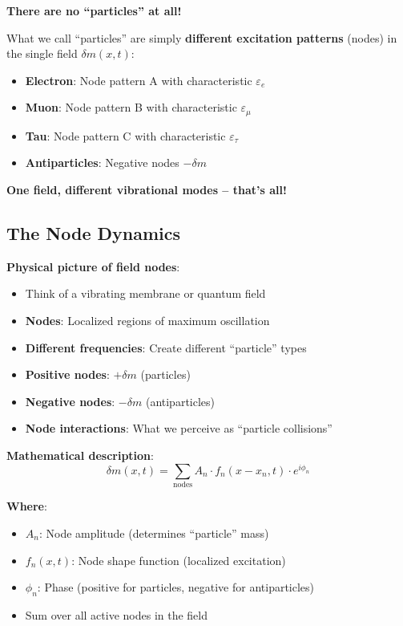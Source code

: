 \documentclass[12pt,a4paper]{article}
\newcommand{\deltam}{\delta m}
\theoremstyle{definition}
\theoremstyle{remark}
\begin{document}
	\begin{tcolorbox}[colback=purple!5!white,colframe=purple!75!black,title=Ultimate Truth: No Separate Particles]
		\textbf{There are no ``particles'' at all!}
		
		What we call ``particles'' are simply \textbf{different excitation patterns} (nodes) in the single field $\deltam(x,t)$:
		
		\begin{itemize}
			\item \textbf{Electron}: Node pattern A with characteristic $\varepsilon_e$
			\item \textbf{Muon}: Node pattern B with characteristic $\varepsilon_{\mu}$
			\item \textbf{Tau}: Node pattern C with characteristic $\varepsilon_{\tau}$
			\item \textbf{Antiparticles}: Negative nodes $-\deltam$
		\end{itemize}
		
		\textbf{One field, different vibrational modes -- that's all!}
	\end{tcolorbox}
	
	\subsection{The Node Dynamics}
	
	\textbf{Physical picture of field nodes}:
	\begin{itemize}
		\item Think of a vibrating membrane or quantum field
		\item \textbf{Nodes}: Localized regions of maximum oscillation
		\item \textbf{Different frequencies}: Create different ``particle'' types
		\item \textbf{Positive nodes}: $+\deltam$ (particles)
		\item \textbf{Negative nodes}: $-\deltam$ (antiparticles)
		\item \textbf{Node interactions}: What we perceive as ``particle collisions''
	\end{itemize}
	
	\textbf{Mathematical description}:
	\begin{equation}
		\deltam(x,t) = \sum_{\text{nodes}} A_n \cdot f_n(x-x_n, t) \cdot e^{i\phi_n}
	\end{equation}
	
	\textbf{Where}:
	\begin{itemize}
		\item $A_n$: Node amplitude (determines ``particle'' mass)
		\item $f_n(x,t)$: Node shape function (localized excitation)
		\item $\phi_n$: Phase (positive for particles, negative for antiparticles)
		\item Sum over all active nodes in the field
	\end{itemize}
	
\end{document}
